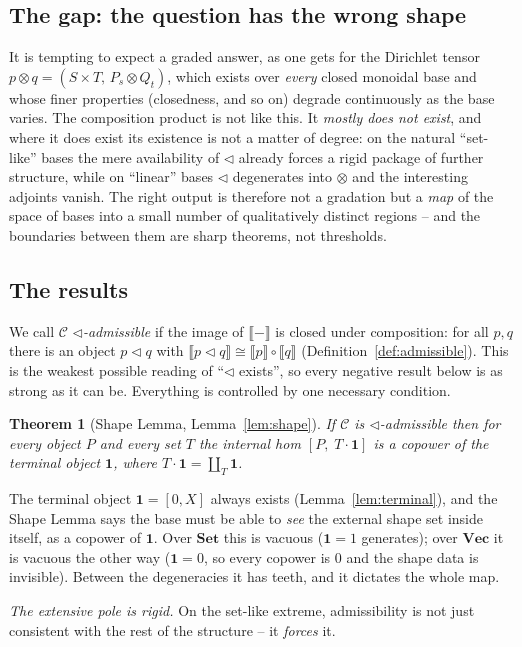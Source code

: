 \documentclass[11pt]{amsart}
\theoremstyle{plain}
\newtheorem{theorem}{Theorem}[section]
\theoremstyle{definition}
\newcommand{\C}{\mathcal{C}}
\newcommand{\ext}[1]{\llbracket #1 \rrbracket}
\newcommand{\Setb}{\mathbf{Set}}
\newcommand{\Vecb}{\mathbf{Vec}}
\newcommand{\comp}{\mathbin{\triangleleft}}
\newcommand{\one}{\mathbf{1}}
\begin{document}
\subsection*{The gap: the question has the wrong shape}
It is tempting to expect a graded answer, as one gets for the Dirichlet tensor
$p\otimes q=(S\times T,\,P_s\otimes Q_t)$, which exists over \emph{every} closed monoidal base and
whose finer properties (closedness, and so on) degrade continuously as the base varies. The
composition product is not like this. It \emph{mostly does not exist}, and where it does exist its
existence is not a matter of degree: on the natural ``set-like'' bases the mere availability of
$\comp$ already forces a rigid package of further structure, while on ``linear'' bases $\comp$
degenerates into $\otimes$ and the interesting adjoints vanish. The right output is therefore not a
gradation but a \emph{map} of the space of bases into a small number of qualitatively distinct
regions -- and the boundaries between them are sharp theorems, not thresholds.

\subsection*{The results}
We call $\C$ \emph{$\comp$-admissible} if the image of $\ext{-}$ is closed under composition:
for all $p,q$ there is an object $p\comp q$ with $\ext{p\comp q}\cong\ext p\circ\ext q$
(Definition~\ref{def:admissible}). This is the weakest possible reading of ``$\comp$ exists'', so
every negative result below is as strong as it can be. Everything is controlled by one necessary
condition.

\begin{theorem}[Shape Lemma, Lemma~\ref{lem:shape}]
If $\C$ is $\comp$-admissible then for every object $P$ and every set $T$ the internal hom
$[P,\;T\cdot\one]$ is a copower of the terminal object $\one$, where $T\cdot\one=\coprod_T\one$.
\end{theorem}

The terminal object $\one=[0,X]$ always exists (Lemma~\ref{lem:terminal}), and the Shape Lemma says
the base must be able to \emph{see} the external shape set inside itself, as a copower of $\one$.
Over $\Setb$ this is vacuous ($\one=1$ generates); over $\Vecb$ it is vacuous the other way
($\one=0$, so every copower is $0$ and the shape data is invisible). Between the degeneracies it has
teeth, and it dictates the whole map.

\emph{The extensive pole is rigid.} On the set-like extreme, admissibility is not just consistent
with the rest of the structure -- it \emph{forces} it.
\end{document}

